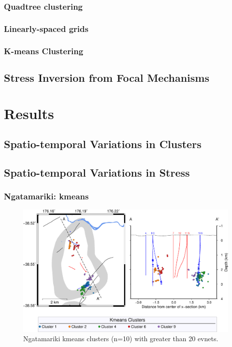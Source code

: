 \subsubsection{Quadtree clustering}
\subsubsection{Linearly-spaced grids}
\subsubsection{K-means Clustering}

\subsection{Stress Inversion from Focal Mechanisms}

\section{Results}
\subsection{Spatio-temporal Variations in Clusters}
\subsection{Spatio-temporal Variations in Stress}
\subsubsection{Ngatamariki: kmeans}

\begin{figure}[h!]
\begin{center}
\includegraphics[width=0.98\columnwidth]{Chapter_5_FMs/figures/merc_Nga_GC_kmeans_10_GC_12-2-18/merc_Nga_kmeans_10_GC_12-2-18_original}
\caption{{Ngatamariki kmeans clusters (n=10) with greater than 20 evnets.
{\label{237918}}%
}}
\end{center}
\end{figure}

